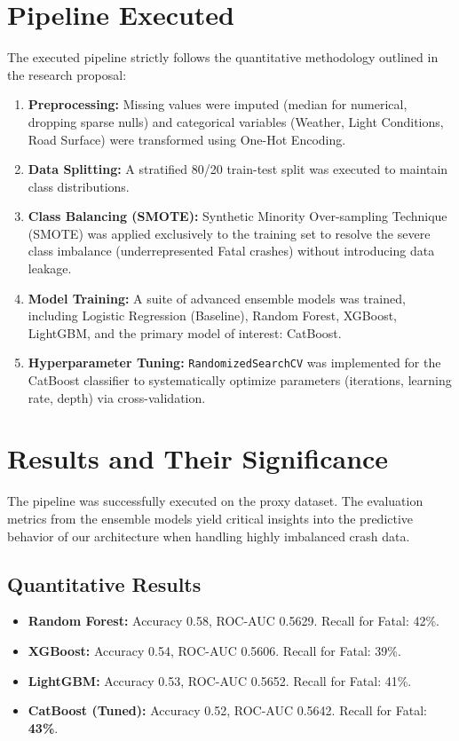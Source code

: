 \documentclass[11pt]{article}
\begin{document}
\section{Pipeline Executed}
The executed pipeline strictly follows the quantitative methodology outlined in the research proposal:
\begin{enumerate}
    \item \textbf{Preprocessing:} Missing values were imputed (median for numerical, dropping sparse nulls) and categorical variables (Weather, Light Conditions, Road Surface) were transformed using One-Hot Encoding.
    \item \textbf{Data Splitting:} A stratified 80/20 train-test split was executed to maintain class distributions.
    \item \textbf{Class Balancing (SMOTE):} Synthetic Minority Over-sampling Technique (SMOTE) was applied exclusively to the training set to resolve the severe class imbalance (underrepresented Fatal crashes) without introducing data leakage.
    \item \textbf{Model Training:} A suite of advanced ensemble models was trained, including Logistic Regression (Baseline), Random Forest, XGBoost, LightGBM, and the primary model of interest: CatBoost.
    \item \textbf{Hyperparameter Tuning:} \texttt{RandomizedSearchCV} was implemented for the CatBoost classifier to systematically optimize parameters (iterations, learning rate, depth) via cross-validation.
\end{enumerate}

\section{Results and Their Significance}
The pipeline was successfully executed on the proxy dataset. The evaluation metrics from the ensemble models yield critical insights into the predictive behavior of our architecture when handling highly imbalanced crash data.

\subsection{Quantitative Results}
\begin{itemize}
    \item \textbf{Random Forest:} Accuracy 0.58, ROC-AUC 0.5629. Recall for Fatal: 42\%.
    \item \textbf{XGBoost:} Accuracy 0.54, ROC-AUC 0.5606. Recall for Fatal: 39\%.
    \item \textbf{LightGBM:} Accuracy 0.53, ROC-AUC 0.5652. Recall for Fatal: 41\%.
    \item \textbf{CatBoost (Tuned):} Accuracy 0.52, ROC-AUC 0.5642. Recall for Fatal: \textbf{43\%}.
\end{itemize}
\end{document}
